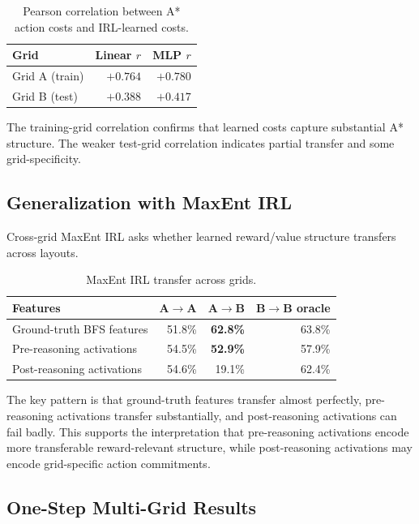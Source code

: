 \documentclass[11pt,a4paper]{article}
\begin{document}
\begin{table}[h]
\centering
\begin{tabular}{lrr}
\toprule
Grid & Linear $r$ & MLP $r$ \\
\midrule
Grid A (train) & $+0.764$ & $+0.780$ \\
Grid B (test) & $+0.388$ & $+0.417$ \\
\bottomrule
\end{tabular}
\caption{Pearson correlation between A* action costs and IRL-learned costs.}
\label{tab:correlation}
\end{table}

The training-grid correlation confirms that learned costs capture substantial A* structure. The weaker test-grid correlation indicates partial transfer and some grid-specificity.

\subsection{Generalization with MaxEnt IRL}

Cross-grid MaxEnt IRL asks whether learned reward/value structure transfers across layouts.

\begin{table}[h]
\centering
\begin{tabular}{lrrr}
\toprule
Features & A$\to$A & A$\to$B & B$\to$B oracle \\
\midrule
Ground-truth BFS features & 51.8\% & \textbf{62.8\%} & 63.8\% \\
Pre-reasoning activations & 54.5\% & \textbf{52.9\%} & 57.9\% \\
Post-reasoning activations & 54.6\% & 19.1\% & 62.4\% \\
\bottomrule
\end{tabular}
\caption{MaxEnt IRL transfer across grids.}
\label{tab:maxent-transfer}
\end{table}

The key pattern is that ground-truth features transfer almost perfectly, pre-reasoning activations transfer substantially, and post-reasoning activations can fail badly. This supports the interpretation that pre-reasoning activations encode more transferable reward-relevant structure, while post-reasoning activations may encode grid-specific action commitments.

\subsection{One-Step Multi-Grid Results}
\end{document}
